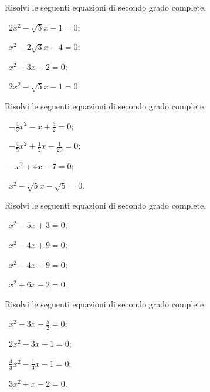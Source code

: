 \begin{esercizio}[\Ast]
 \label{ese:3.14}
Risolvi le seguenti equazioni di secondo grado complete.
\begin{multicols}{2}
 \begin{enumeratea}
 \item~$2 x^{2}-\sqrt{5} x-1 = 0$;
 \item~$x^{2}-2 \sqrt{3} x-4=0$;
 \item~$x^{2}-3 x-2=0$;
 \item~$2 x^{2}-\sqrt{5} x-1=0$.
 \end{enumeratea}
 \end{multicols}
\end{esercizio}
\newpage
\begin{esercizio}[\Ast]
 \label{ese:3.15}
Risolvi le seguenti equazioni di secondo grado complete.
\begin{multicols}{2}
 \begin{enumeratea}
 \item~$- \frac{4}{3} x^{2}-x + \frac{3}{2}=0$;
 \item~$- \frac{4}{5} x^{2} + \frac{1}{2} x-\frac{1}{20}=0$;
 \item~$- x^{2} + 4 x-7=0$;
 \item~$x^{2}-\sqrt{5} x-\sqrt{5}=0$.
 \end{enumeratea}
 \end{multicols}
\end{esercizio}

\begin{esercizio}[\Ast]
 \label{ese:3.16}
Risolvi le seguenti equazioni di secondo grado complete.
\begin{multicols}{2}
 \begin{enumeratea}
 \item~$x^{2}-5 x + 3 = 0$;
 \item~$x^{2}-4 x + 9 = 0$;
 \item~$x^{2}-4 x-9 = 0$;
 \item~$x^{2} + 6 x-2 = 0$.
 \end{enumeratea}
 \end{multicols}
\end{esercizio}

\begin{esercizio}[\Ast]
 \label{ese:3.17}
Risolvi le seguenti equazioni di secondo grado complete.
\begin{multicols}{2}
 \begin{enumeratea}
 \item~$x^{2}-3 x-\frac{5}{2} = 0$;
 \item~$2 x^{2}-3 x + 1 = 0$;
 \item~$\frac{4}{3} x^{2}-\frac{1}{3} x-1 = 0$;
 \item~$3 x^{2} + x-2 = 0$.
 \end{enumeratea}
 \end{multicols}
\end{esercizio}

